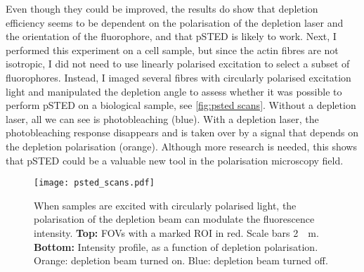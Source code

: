 Even though they could be improved, the results do show that depletion efficiency seems to be dependent on the polarisation of the depletion laser and the orientation of the fluorophore, and that pSTED is likely to work. Next, I performed this experiment on a cell sample, but since the actin fibres are not isotropic, I did not need to use linearly polarised excitation to select a subset of fluorophores. Instead, I imaged several fibres with circularly polarised excitation light and manipulated the depletion angle to assess whether it was possible to perform pSTED on a biological sample, see \autoref{fig:psted scans}. Without a depletion laser, all we can see is photobleaching (blue). With a depletion laser, the photobleaching response disappears and is taken over by a signal that depends on the depletion polarisation (orange). Although more research is needed, this shows that pSTED could be a valuable new tool in the polarisation microscopy field.

\begin{figure}
	\centering
	\texttt{[image: psted\_scans.pdf]}
	\caption{
		When samples are excited with circularly polarised light, the polarisation of the depletion beam can modulate the fluorescence intensity. \textbf{Top:} FOVs with a marked ROI in red. Scale bars \SI{2}{\mu m}. \textbf{Bottom:} Intensity profile, as a function of depletion polarisation. Orange: depletion beam turned on. Blue: depletion beam turned off.
	}
	\label{fig:psted scans}
\end{figure}




























